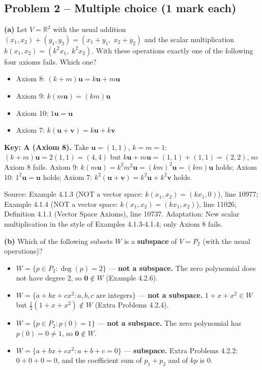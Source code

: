 \documentclass[11pt,a4paper]{article}
\newcommand{\Src}[1]{{\footnotesize\color{black!65}Source: #1}}
\begin{document}
\subsection*{Problem 2 -- Multiple choice (1 mark each)}
\textbf{(a)} Let $V=\mathbb{R}^2$ with the usual addition $(x_1,x_2)+(y_1,y_2)=(x_1+y_1,\;x_2+y_2)$ and the scalar multiplication $k(x_1,x_2)=(k^2x_1,\;k^2x_2)$. With these operations exactly one of the following four axioms fails. Which one?\par
\begin{itemize}[leftmargin=8mm,itemsep=0pt]\item[A$^{\ast}$] Axiom 8: $(k+m)\mathbf{u}=k\mathbf{u}+m\mathbf{u}$\item[B] Axiom 9: $k(m\mathbf{u})=(km)\mathbf{u}$\item[C] Axiom 10: $1\mathbf{u}=\mathbf{u}$\item[D] Axiom 7: $k(\mathbf{u}+\mathbf{v})=k\mathbf{u}+k\mathbf{v}$\end{itemize}
\textbf{Key: A (Axiom 8).} Take $\mathbf{u}=(1,1)$, $k=m=1$: $(k+m)\mathbf{u}=2(1,1)=(4,4)$ but $k\mathbf{u}+m\mathbf{u}=(1,1)+(1,1)=(2,2)$, so Axiom 8 fails. Axiom 9: $k(m\mathbf{u})=k^2m^2\mathbf{u}=(km)^2\mathbf{u}=(km)\mathbf{u}$ holds; Axiom 10: $1^2\mathbf{u}=\mathbf{u}$ holds; Axiom 7: $k^2(\mathbf{u}+\mathbf{v})=k^2\mathbf{u}+k^2\mathbf{v}$ holds.\par
\Src{Example 4.1.3 (NOT a vector space: $k(x_1,x_2)=(kx_1,0)$), line 10977; Example 4.1.4 (NOT a vector space: $k(x_1,x_2)=(kx_1,x_2)$), line 11026; Definition 4.1.1 (Vector Space Axioms), line 10737. Adaptation: New scalar multiplication in the style of Examples 4.1.3-4.1.4; only Axiom 8 fails.}\par
{}\textbf{(b)} Which of the following subsets $W$ is a \textbf{subspace} of $V=P_2$ (with the usual operations)?\par
\begin{itemize}[leftmargin=8mm,itemsep=0pt]\item[A] $W=\{p\in P_2 : \deg(p)=2\}$ --- \textbf{not a subspace.} The zero polynomial does not have degree 2, so $\mathbf{0}\notin W$ (Example 4.2.6).\item[B] $W=\{a+bx+cx^2 : a,b,c \text{ are integers}\}$ --- \textbf{not a subspace.} $1+x+x^2\in W$ but $\tfrac12(1+x+x^2)\notin W$ (Extra Problems 4.2.4).\item[C] $W=\{p\in P_2 : p(0)=1\}$ --- \textbf{not a subspace.} The zero polynomial has $p(0)=0\neq1$, so $\mathbf{0}\notin W$.\item[D$^{\ast}$] $W=\{a+bx+cx^2 : a+b+c=0\}$ --- \textbf{subspace.} Extra Problems 4.2.2: $0+0+0=0$, and the coefficient sum of $p_1+p_2$ and of $kp$ is $0$.\end{itemize}
\end{document}
